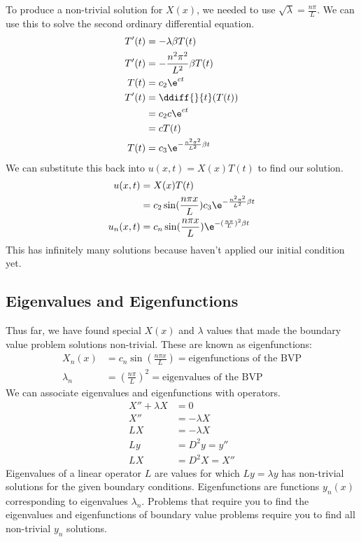 \documentclass{math}
\begin{document}
To produce a non-trivial solution for \( X(x) \), we needed to use
\( \sqrt{\lambda} = \frac{n\pi}{L} \). We can use this to solve the second
ordinary differential equation.
\begin{align*}
  T'(t) &= -\lambda\beta T(t) \\
  T'(t) &= -\frac{n^2\pi^2}{L^2}\beta T(t) \\
  T(t) &= c_2\e^{ct} \\
  T'(t) &= \ddiff{}{t}(T(t)) \\
  &= c_2c\e^{ct} \\
  &= cT(t) \\
  T(t) &= c_3\e^{-\frac{n^2\pi^2}{L^2}\beta t}
\end{align*}
We can substitute this back into \( u(x,t) = X(x)T(t) \) to find our solution.
\begin{align*}
  u(x,t) &= X(x)T(t) \\
  &= c_2\sin(\frac{n\pi x}{L})c_3\e^{-\frac{n^2\pi^2}{L^2}\beta t} \\
  u_n(x,t) &= c_n\sin(\frac{n\pi x}{L})\e^{-(\frac{n\pi}{L})^2\beta t}
\end{align*}
This has infinitely many solutions because haven't applied our initial condition
yet.

\subsection*{Eigenvalues and Eigenfunctions}
Thus far, we have found special \( X(x) \) and \( \lambda \) values that made
the boundary value problem solutions non-trivial. These are known as
eigenfunctions:
\begin{align*}
  X_n(x) &= c_n\sin(\frac{n\pi x}{L}) = \text{eigenfunctions of the BVP} \\
  \lambda_n &= (\frac{n\pi}{L})^2 = \text{eigenvalues of the BVP}
\end{align*}
We can associate eigenvalues and eigenfunctions with operators.
\begin{align*}
  X''+\lambda X &= 0 \\
  X'' &= -\lambda X \\
  LX &= -\lambda X \\
  Ly &= D^2y = y'' \\
  LX &= D^2X = X''
\end{align*}
Eigenvalues of a linear operator \( L \) are values for which \( Ly =
\lambda y \) has non-trivial solutions for the given boundary conditions.
Eigenfunctions are functions \( y_n(x) \) corresponding to eigenvalues
\( \lambda_n \). Problems that require you to find the eigenvalues and
eigenfunctions of boundary value problems require you to find all non-trivial
\( y_n \) solutions.
\end{document}
